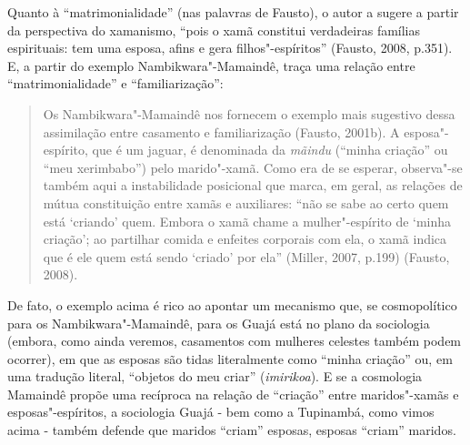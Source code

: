 Quanto à ``matrimonialidade'' (nas palavras de Fausto), o autor a sugere a
partir da perspectiva do xamanismo, ``pois o xamã constitui verdadeiras
famílias espirituais: tem uma esposa, afins e gera filhos"-espíritos''
(Fausto, 2008, p.351). E, a partir do exemplo Nambikwara"-Mamaindê, traça
uma relação entre ``matrimonialidade'' e ``familiarização'':

\begin{quote}
Os Nambikwara"-Mamaindê nos fornecem o exemplo mais sugestivo dessa
assimilação entre casamento e familiarização (Fausto, 2001b). A
esposa"-espírito, que é um jaguar, é denominada da \emph{mãindu} (``minha
criação'' ou ``meu xerimbabo'') pelo marido"-xamã. Como era de se
esperar, observa"-se também aqui a instabilidade posicional que marca, em
geral, as relações de mútua constituição entre xamãs e auxiliares: ``não
se sabe ao certo quem está `criando' quem. Embora o xamã chame a
mulher"-espírito de `minha criação'; ao partilhar comida e enfeites
corporais com ela, o xamã indica que é ele quem está sendo `criado' por
ela'' (Miller, 2007, p.199) (Fausto, 2008).
\end{quote}

De fato, o exemplo acima é rico ao apontar um mecanismo que, se
cosmopolítico para os Nambikwara"-Mamaindê, para os Guajá está no plano
da sociologia (embora, como ainda veremos, casamentos com mulheres
celestes também podem ocorrer), em que as esposas são tidas literalmente
como ``minha criação'' ou, em uma tradução literal, ``objetos do meu criar''
(\emph{imirikoa}). E se a cosmologia Mamaindê propõe uma recíproca na
relação de ``criação'' entre maridos"-xamãs e esposas"-espíritos, a
sociologia Guajá - bem como a Tupinambá, como vimos acima - também
defende que maridos ``criam'' esposas, esposas ``criam'' maridos.

